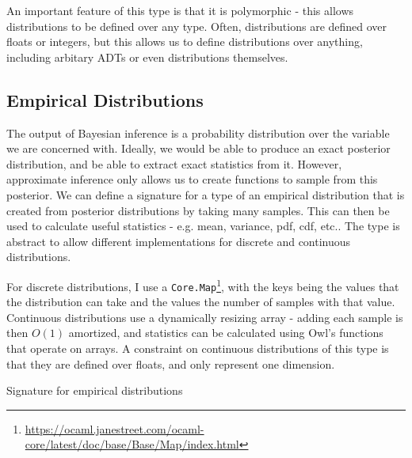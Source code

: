 An important feature of this type is that it is polymorphic - this allows distributions to be defined over any type. Often, distributions are defined over floats or integers, but this allows us to define distributions over anything, including arbitary ADTs or even distributions themselves.

\subsection{Empirical Distributions}

The output of Bayesian inference is a probability distribution over the variable we are concerned with. Ideally, we would be able to produce an exact posterior distribution, and be able to extract exact statistics from it. However, approximate inference only allows us to create functions to sample from this posterior. We can define a signature for a type of an empirical distribution that is created from posterior distributions by taking many samples. This can then be used to calculate useful statistics - e.g. mean, variance, pdf, cdf, etc.. The type is abstract to allow different implementations for discrete and continuous distributions. 
	
For discrete distributions, I use a \texttt{Core.Map}\footnote{\url{https://ocaml.janestreet.com/ocaml-core/latest/doc/base/Base/Map/index.html}}, with the keys being the values that the distribution can take and the values the number of samples with that value. Continuous distributions use a dynamically resizing array - adding each sample is then $O(1)$ amortized, and statistics can be calculated using Owl's functions that operate on arrays. A constraint on continuous distributions of this type is that they are defined over floats, and only represent one dimension.
	
	
\begin{listing}[ht]
	\caption{Signature for empirical distributions}
	\label{lst:empirical}
\end{listing}
	
